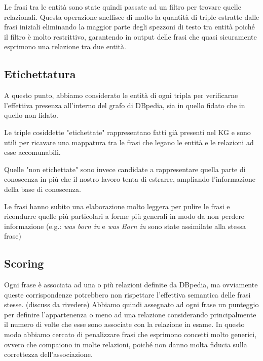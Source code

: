 \documentclass[10pt,a4paper,twocolumn]{article}
\begin{document}
Le frasi tra le entità sono state quindi passate ad un filtro per trovare quelle relazionali. Questa operazione snellisce di molto la quantità di triple estratte dalle frasi iniziali eliminando la maggior parte degli spezzoni di testo tra entità poiché il filtro è molto restrittivo, garantendo in output delle frasi che quasi sicuramente esprimono una relazione tra due entità.

\subsection{Etichettatura}
A questo punto, abbiamo considerato le entità di ogni tripla per verificarne l'effettiva presenza all'interno del grafo di DBpedia, sia in quello fidato che in quello non fidato.

Le triple cosiddette "etichettate" rappresentano fatti già presenti nel KG e sono utili per ricavare una mappatura tra le frasi che legano le entità e le relazioni ad esse accomunabili.

Quelle "non etichettate" sono invece candidate a rappresentare quella parte di conoscenza in più che il nostro lavoro tenta di estrarre, ampliando l'informazione della base di conoscenza.

Le frasi hanno subito una elaborazione molto leggera per pulire le frasi e ricondurre quelle più particolari a forme più generali in modo da non perdere informazione (e.g.: \textit{was born in} e \textit{was Born in} sono state assimilate alla stessa frase)

\subsection{Scoring}

Ogni frase è associata ad una o più relazioni definite da DBpedia, ma ovviamente queste corrispondenze potrebbero non rispettare l'effettiva semantica delle frasi stesse. (discuss da rivedere) Abbiamo quindi assegnato ad ogni frase un punteggio per definire l'appartenenza o meno ad una relazione considerando principalmente il numero di volte che esse sono associate con la relazione in esame. In questo modo abbiamo cercato di penalizzare frasi che esprimono concetti molto generici, ovvero che compaiono in molte relazioni, poiché non danno molta fiducia sulla correttezza dell'associazione.
\end{document}
